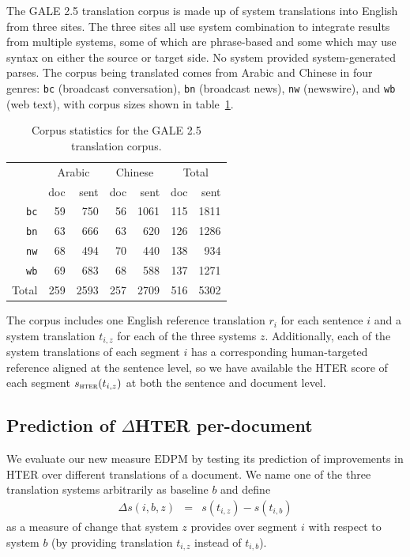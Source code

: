 \documentclass[11pt]{article}
\newcommand{\myEDPM}[0]{\ensuremath{\mathrm{EDPM}}}
\begin{document}
The GALE 2.5 translation corpus is made up of system translations into
English from three sites.
The three sites all use system combination to integrate results from
multiple systems, some of which are phrase-based and some which may
use syntax on either the source or target side. No system provided
system-generated parses.
%
The corpus being translated comes from
Arabic and Chinese in four genres: \texttt{bc} (broadcast
conversation), \texttt{bn} (broadcast news), \texttt{nw} (newswire),
and \texttt{wb} (web text), with corpus sizes shown in
table~\ref{tab:galestats}.
\begin{table}
  \centering
  \begin{tabular}{r|rr|rr|rr}
     & \multicolumn{2}{c|}{Arabic} & \multicolumn{2}{c|}{Chinese}
     & \multicolumn{2}{c}{Total}\\
     & doc & sent & doc & sent & doc   & sent\\
     \hline
     \texttt{bc}    & 59  & 750 & 56 & 1061 & 115 & 1811\\
     \texttt{bn}    & 63  & 666 & 63 & 620  & 126 & 1286\\
     \texttt{nw}    & 68  & 494 & 70 & 440  & 138 & 934 \\
     \texttt{wb}    & 69  & 683 & 68 & 588  & 137 & 1271\\
     \hline
     Total & 259 & 2593& 257& 2709 & 516 & 5302\\
  \end{tabular}
  \caption{Corpus statistics for the GALE 2.5 translation
    corpus.}
  \label{tab:galestats}
\end{table}
The corpus includes one English reference translation $r_i$
\cite{gale08phase2_5references} for each sentence $i$ and a system
translation $t_{i,z}$ for each of the three systems
$z$. Additionally, each of the system translations of each segment $i$
has a corresponding human-targeted reference aligned at the sentence
level, so we have available the HTER score of each segment
$s_{\textsc{hter}}(t_{i,z})$ at both the sentence and document level.

\subsection{Prediction of $\Delta$HTER per-document}

We evaluate our new measure \myEDPM{} by testing its prediction of
improvements in HTER over different translations of a document.
We name one of the three translation systems arbitrarily as baseline
$b$ and define
\begin{eqnarray}
  \label{eq:delta}
  \Delta s(i,b,z) & = & s(t_{i,z}) - s(t_{i,b})
\end{eqnarray}
as a measure of change %
that system $z$ provides over segment $i$ with respect to system $b$
(by providing translation $t_{i,z}$ instead of $t_{i,b}$).
\end{document}
